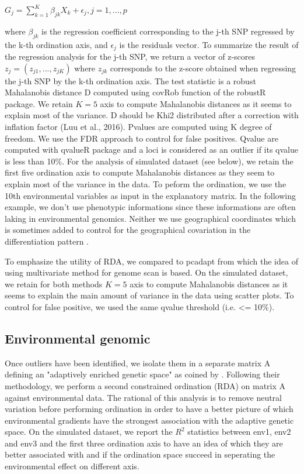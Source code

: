\documentclass[nogrid]{MBE}%
\begin{document}
$G_j = \sum^{K}_{k=1}\beta_{jk}X_{k}+\epsilon_{j}, j=1,...,p$

where $\beta_{jk}$ is the regression coefficient corresponding to the j-th SNP regressed by the k-th ordination axis, and $\epsilon_{j}$ is the residuals vector. To summarize the result of the regression analysis for the j-th SNP, we return a vector of z-scores $z_{j} = (z_{j1}, ..., z_{jK})$ where $z_{jk}$ corresponds to the z-score obtained when regressing the j-th SNP by the k-th ordination axis.
The test statistic is a robust Mahalanobis distance D computed using covRob function of the robustR package. We retain $K=5$ axis to compute Mahalanobis distances as it seems to explain most of the variance. D should be Khi2 distributed after a correction with inflation factor (Luu et al., 2016). Pvalues are computed using K degree of freedom. We use the FDR approach to control for false positives. Qvalue are computed with qvalueR package and a loci is considered as an outlier if its qvalue is less than 10\%.
For the analysis of simulated dataset (see below), we retain the first five ordination axis to compute Mahalanobis distances as they seem to explain most of the variance in the data. To peform the ordination, we use the 10th environmental variables as input in the explanatory matrix. In the following example, we don't use phenotypic informations since these informations are often laking in environmental genomics. Neither we use geographical coordinates which is sometimes added to control for the geographical covariation in the differentiation pattern \citep{Frichot2013}.

To emphasize the utility of RDA, we compared to pcadapt from which the idea of using multivariate method for genome scan is based. On the simulated dataset, we retain for both methods $K=5$ axis to compute Mahalanobis distances  as it seems to explain the main amount of variance in the data using scatter plots. To control for false positive, we used the same qvalue threshold (i.e. <= 10\%).


\subsection{Environmental genomic}

Once outliers have been identified, we isolate them in a separate matrix A defining an "adaptively enriched genetic space" as coined by \citet{Steane2014a}. Following their methodology, we perform a second constrained ordination (RDA) on matrix A against environmental data. The rational of this analysis is to remove neutral variation before performing ordination in order to have a better picture of which environmental gradients have the strongest association with the adaptive genetic space. On the simulated dataset, we report the $R^2$ statistics between env1, env2 and env3 and the first three ordination axis to have an idea of which they are better associated with and if the ordination space succeed in seperating the environmental effect on different axis.
\end{document}
